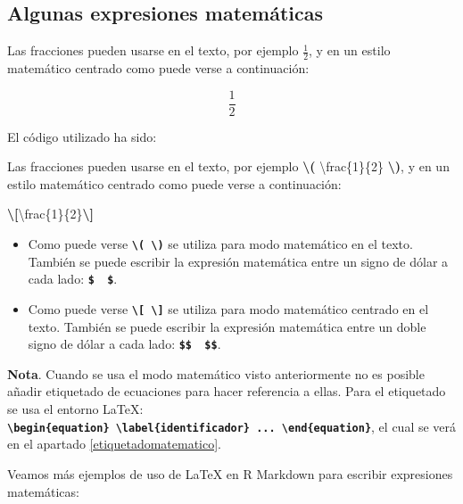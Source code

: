 \documentclass[12pt,a4paper,]{book}
\newenvironment{Shaded}{\begin{snugshade}}{\end{snugshade}}
\newcommand{\NormalTok}[1]{#1}
\newcommand{\SpecialCharTok}[1]{\textcolor[rgb]{0.81,0.36,0.00}{\textbf{#1}}}
\numberwithin{dummy}{section}
\theoremstyle{ocrenumbox}
\theoremstyle{blacknumex}
\theoremstyle{blacknumbox}
\theoremstyle{ocrenum}
\theoremstyle{ocrenum}
\begin{document}
\hypertarget{algunas-expresiones-matemuxe1ticas}{%
\subsection{Algunas expresiones
matemáticas}\label{algunas-expresiones-matemuxe1ticas}}

Las fracciones pueden usarse en el texto, por ejemplo \(\frac{1}{2}\), y
en un estilo matemático centrado como puede verse a continuación:

\[\frac{1}{2}\]

El código utilizado ha sido:

\begin{Shaded}
\begin{Highlighting}[]
\NormalTok{Las fracciones pueden usarse en el texto, por ejemplo }\SpecialCharTok{\textbackslash{}(}\NormalTok{ \textbackslash{}frac\{1\}\{2\} }\SpecialCharTok{\textbackslash{})}\NormalTok{, }
\NormalTok{y en un estilo matemático centrado como puede verse a continuación:}
 
\SpecialCharTok{\textbackslash{}[}\NormalTok{\textbackslash{}frac\{1\}\{2\}}\SpecialCharTok{\textbackslash{}]}
\end{Highlighting}
\end{Shaded}

\begin{itemize}
\item
  Como puede verse
  \textbf{\texttt{\textbackslash{}(\ \textbackslash{})}} se utiliza para
  modo matemático en el texto. También se puede escribir la expresión
  matemática entre un signo de dólar a cada lado:
  \textbf{\texttt{\$\ \ \$}}.
\item
  Como puede verse
  \textbf{\texttt{\textbackslash{}{[}\ \textbackslash{}{]}}} se utiliza
  para modo matemático centrado en el texto. También se puede escribir
  la expresión matemática entre un doble signo de dólar a cada lado:
  \textbf{\texttt{\$\$\ \ \$\$}}.
\end{itemize}

\textbf{Nota}. Cuando se usa el modo matemático visto anteriormente no
es posible añadir etiquetado de ecuaciones para hacer referencia a
ellas. Para el etiquetado se usa el entorno LaTeX:
\textbf{\texttt{\textbackslash{}begin\{equation\}\ \textbackslash{}label\{identificador\}\ ...\ \textbackslash{}end\{equation\}}},
el cual se verá en el apartado \ref{etiquetadomatematico}.

Veamos más ejemplos de uso de LaTeX en R Markdown para escribir
expresiones matemáticas:
\end{document}
